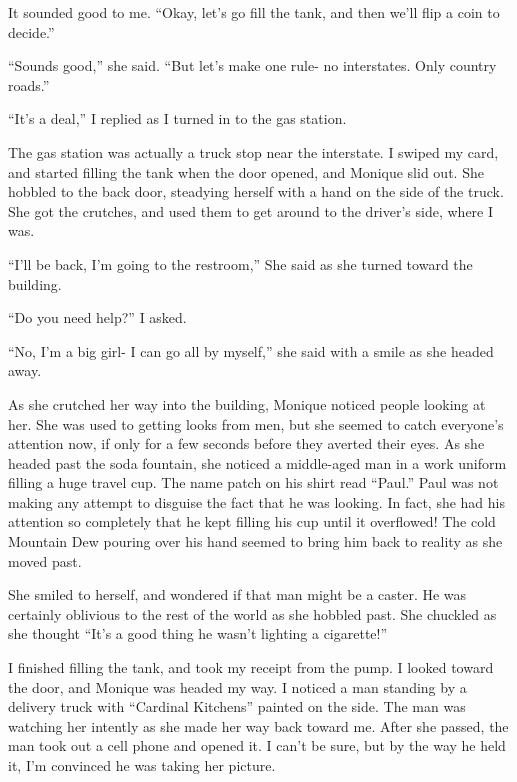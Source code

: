 It sounded good to me. ``Okay, let's go fill the tank, and then we'll flip a coin to
decide.''

``Sounds good,'' she said. ``But let's make one rule- no interstates. Only country roads.''

``It's a deal,'' I replied as I turned in to the gas station.

The gas station was actually a truck stop near the interstate. I swiped my card, and
started filling the tank when the door opened, and Monique slid out. She hobbled to the back
door, steadying herself with a hand on the side of the truck. She got the crutches, and used
them to get around to the driver's side, where I was.

``I'll be back, I'm going to the restroom,'' She said as she turned toward the building.

``Do you need help?'' I asked.

``No, I'm a big girl- I can go all by myself,'' she said with a smile as she headed away.

\begin{thought}
As she crutched her way into the building, Monique noticed people looking at her. She was
used to getting looks from men, but she seemed to catch everyone's attention now, if only for a
few seconds before they averted their eyes. As she headed past the soda fountain, she noticed a
middle-aged man in a work uniform filling a huge travel cup. The name patch on his shirt read
``Paul.'' Paul was not making any attempt to disguise the fact that he was looking. In fact, she
had his attention so completely that he kept filling his cup until it overflowed! The cold
Mountain Dew pouring over his hand seemed to bring him back to reality as she moved past.

She smiled to herself, and wondered if that man might be a caster. He was certainly
oblivious to the rest of the world as she hobbled past. She chuckled as she thought ``It's a
good
thing he wasn't lighting a cigarette!''
\end{thought}

I finished filling the tank, and took my receipt from the pump. I looked toward the door,
and Monique was headed my way. I noticed a man standing by a delivery truck with ``Cardinal
Kitchens'' painted on the side. The man was watching her intently as she made her way back
toward
me. After she passed, the man took out a cell phone and opened it. I can't be sure, but by the
way he held it, I'm convinced he was taking her picture.

